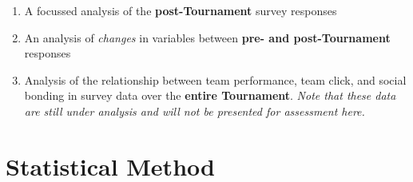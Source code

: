 
















\begin{enumerate}
  \item A focussed analysis of the \textbf{post-Tournament} survey responses
  \item An analysis of \textit{changes} in variables between \textbf{pre- and post-Tournament} responses
  \item Analysis of the relationship between team performance, team click, and social bonding in survey data over the \textbf{entire Tournament}. \textit{Note that these data are still under analysis and will not be presented for assessment here.}
\end{enumerate}














\section{\label{app5:stats}Statistical Method}

